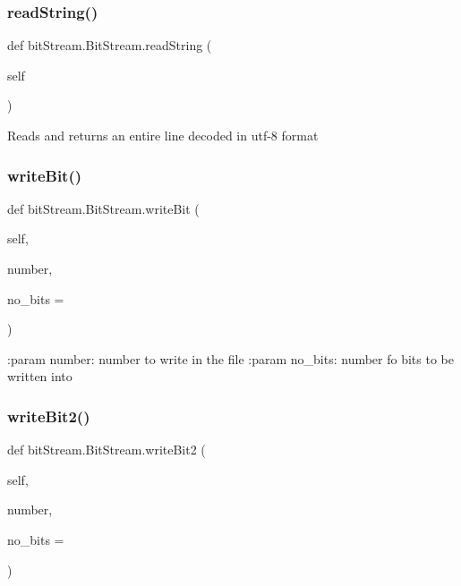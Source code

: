 \subsubsection{\texorpdfstring{read\+String()}{readString()}}
{\footnotesize\ttfamily def bit\+Stream.\+Bit\+Stream.\+read\+String (\begin{DoxyParamCaption}\item[{}]{self }\end{DoxyParamCaption})}

\begin{DoxyVerb}Reads and returns an entire line decoded in utf-8 format
\end{DoxyVerb}
 \mbox{\label{classbitStream_1_1BitStream_af4fe2752f4ced1a45314bcd5549442f8}} 
\subsubsection{\texorpdfstring{write\+Bit()}{writeBit()}}
{\footnotesize\ttfamily def bit\+Stream.\+Bit\+Stream.\+write\+Bit (\begin{DoxyParamCaption}\item[{}]{self,  }\item[{}]{number,  }\item[{}]{no\+\_\+bits = {} }\end{DoxyParamCaption})}

\begin{DoxyVerb}:param number: number to write in the file
:param no_bits: number fo bits to be written into
\end{DoxyVerb}
 \mbox{\label{classbitStream_1_1BitStream_af8a10dd7fc3b4da5a580287e59bb5448}} 
\subsubsection{\texorpdfstring{write\+Bit2()}{writeBit2()}}
{\footnotesize\ttfamily def bit\+Stream.\+Bit\+Stream.\+write\+Bit2 (\begin{DoxyParamCaption}\item[{}]{self,  }\item[{}]{number,  }\item[{}]{no\+\_\+bits = {} }\end{DoxyParamCaption})}



